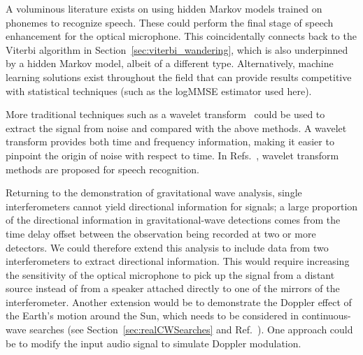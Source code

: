 \documentclass[paper-main.tex]{subfiles}
\begin{document}
A voluminous literature exists on using hidden Markov models trained on phonemes to recognize speech.\cite{HMM_english}
These could perform the final stage of speech enhancement for the optical microphone. 
This coincidentally connects back to the Viterbi algorithm in Section~\ref{sec:viterbi_wandering}, which is also underpinned by a hidden Markov model, albeit of a different type. 
Alternatively, machine learning solutions exist throughout the field that can provide results competitive with statistical techniques (such as the logMMSE estimator used here).\cite{SEGAN}


More traditional techniques such as a wavelet transform~\citep{nason1995stationary} could be used to extract the signal from noise and compared with the above methods. 
A wavelet transform provides both time and frequency information, making it easier to pinpoint the origin of noise with respect to time. 
In Refs.~\cite{tufekci2000feature,agbinya1996discrete}, wavelet transform methods are proposed for speech recognition. 


Returning to the demonstration of gravitational wave analysis, single interferometers cannot yield directional information for signals; a large proportion of the directional information in gravitational-wave detections comes from the time delay offset between the observation being recorded at two or more detectors.\cite{GW150914}
We could therefore extend this analysis to include data from two interferometers to extract directional information.
This would require increasing the sensitivity of the optical microphone to pick up the signal from a distant source instead of from a speaker attached directly to one of the mirrors of the interferometer.
Another extension would be to demonstrate the Doppler effect of the Earth's motion around the Sun, which needs to be considered in continuous-wave searches (see Section~\ref{sec:realCWSearches} and Ref.~\cite{JKS:1998}). 
One approach could be to modify the input audio signal to simulate Doppler modulation. 
\end{document}
